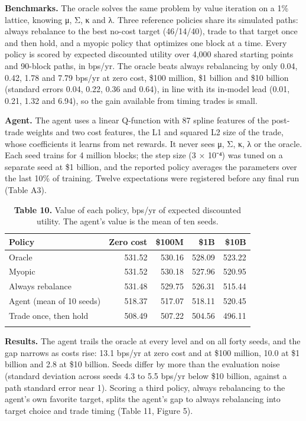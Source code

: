 \documentclass[
  11pt]{article}
\begin{document}
\textbf{Benchmarks.} The oracle solves the same problem by value
iteration on a 1\% lattice, knowing μ, Σ, κ and λ. Three reference
policies share its simulated paths: always rebalance to the best no-cost
target (46/14/40), trade to that target once and then hold, and a myopic
policy that optimizes one block at a time. Every policy is scored by
expected discounted utility over 4,000 shared starting points and
90-block paths, in bps/yr. The oracle beats always rebalancing by only
0.04, 0.42, 1.78 and 7.79 bps/yr at zero cost, \$100 million, \$1
billion and \$10 billion (standard errors 0.04, 0.22, 0.36 and 0.64), in
line with its in-model lead (0.01, 0.21, 1.32 and 6.94), so the gain
available from timing trades is small.

\textbf{Agent.} The agent uses a linear Q-function with 87 spline
features of the post-trade weights and two cost features, the L1 and
squared L2 size of the trade, whose coefficients it learns from net
rewards. It never sees μ, Σ, κ, λ or the oracle. Each seed trains for 4
million blocks; the step size (3 × 10⁻⁴) was tuned on a separate seed at
\$1 billion, and the reported policy averages the parameters over the
last 10\% of training. Twelve expectations were registered before any
final run (Table A3).

\begin{table}[htbp]
\centering\small
\caption{\textbf{Table 10.} Value of each policy, bps/yr of expected
discounted utility. The agent's value is the mean of ten
seeds.}
\begin{tabular}{@{}lrrrr@{}}
\toprule\noalign{}
Policy & Zero cost & \$100M & \$1B & \$10B \\
\midrule\noalign{}
Oracle & 531.52 & 530.16 & 528.09 & 523.22 \\
Myopic & 531.52 & 530.18 & 527.96 & 520.95 \\
Always rebalance & 531.48 & 529.75 & 526.31 & 515.44 \\
Agent (mean of 10 seeds) & 518.37 & 517.07 & 518.11 & 520.45 \\
Trade once, then hold & 508.49 & 507.22 & 504.56 & 496.11 \\
\bottomrule\noalign{}
\end{tabular}
\end{table}

\textbf{Results.} The agent trails the oracle at every level and on all
forty seeds, and the gap narrows as costs rise: 13.1 bps/yr at zero cost
and at \$100 million, 10.0 at \$1 billion and 2.8 at \$10 billion. Seeds
differ by more than the evaluation noise (standard deviation across
seeds 4.3 to 5.5 bps/yr below \$10 billion, against a path standard
error near 1). Scoring a third policy, always rebalancing to the agent's
own favorite target, splits the agent's gap to always rebalancing into
target choice and trade timing (Table 11, Figure 5).
\end{document}
